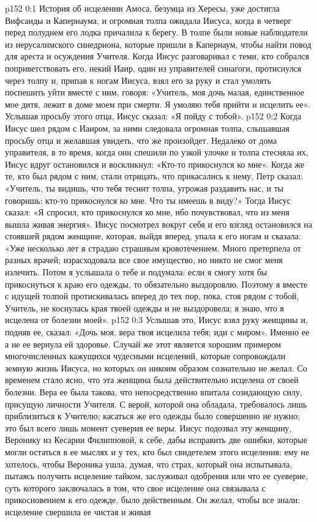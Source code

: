 \author{Комиссия срединников}
\vs p152 0:1 История об исцелении Амоса, безумца из Хересы, уже достигла Вифсаиды и Капернаума, и огромная толпа ожидала Иисуса, когда в четверг перед полуднем его лодка причалила к берегу. В толпе были новые наблюдатели из иерусалимского синедриона, которые пришли в Капернаум, чтобы найти повод для ареста и осуждения Учителя. Когда Иисус разговаривал с теми, кто собрался поприветствовать его, некий Иаир, один из управителей синагоги, протиснулся через толпу и, припав к ногам Иисуса, взял его за руку и стал умолять поспешить уйти вместе с ним, говоря: «Учитель, моя дочь малая, единственное мое дитя, лежит в доме моем при смерти. Я умоляю тебя прийти и исцелить ее». Услышав просьбу этого отца, Иисус сказал: «Я пойду с тобой».
\vs p152 0:2 Когда Иисус шел рядом с Иаиром, за ними следовала огромная толпа, слышавшая просьбу отца и желавшая увидеть, что же произойдет. Недалеко от дома управителя, в то время, когда они спешили по узкой улочке и толпа стесняла их, Иисус вдруг остановился и воскликнул: «Кто\hyp{}то прикоснулся ко мне». Когда же те, кто был рядом с ним, стали отрицать, что прикасались к нему, Петр сказал: «Учитель, ты видишь, что тебя теснит толпа, угрожая раздавить нас, и ты говоришь: кто\hyp{}то прикоснулся ко мне. Что ты имеешь в виду?» Тогда Иисус сказал: «Я спросил, кто прикоснулся ко мне, ибо почувствовал, что из меня вышла живая энергия». Иисус посмотрел вокруг себя и его взгляд остановился на стоявшей рядом женщине, которая, выйдя вперед, упала к его ногам и сказала: «Уже несколько лет я страдаю страшным кровотечением. Много претерпела от разных врачей; израсходовала все свое имущество, но никто не смог меня излечить. Потом я услышала о тебе и подумала: если я смогу хотя бы прикоснуться к краю его одежды, то обязательно выздоровлю. Поэтому я вместе с идущей толпой протискивалась вперед до тех пор, пока, стоя рядом с тобой, Учитель, не коснулась края твоей одежды и не выздоровела; я знаю, что я исцелена от болезни моей».
\vs p152 0:3 Услышав это, Иисус взял руку женщины и, подняв ее, сказал: «Дочь моя, вера твоя исцелила тебя; иди с миром». Именно ее  а не ее  вернула ей здоровье. Случай же этот является хорошим примером многочисленных кажущихся чудесными исцелений, которые сопровождали земную жизнь Иисуса, но которых он никоим образом сознательно не желал. Со временем стало ясно, что эта женщина была действительно исцелена от своей болезни. Вера ее была такова, что непосредственно впитала созидающую силу, присущую личности Учителя. С верой, которой она обладала, требовалось лишь приблизиться к Учителю; касаться же его одежды было совершенно не нужно; это был всего лишь момент суеверия ее веры. Иисус подозвал эту женщину, Веронику из Кесарии Филипповой, к себе, дабы исправить две ошибки, которые могли остаться в ее мыслях и у тех, кто был свидетелем этого исцеления: ему не хотелось, чтобы Вероника ушла, думая, что страх, который она испытывала, пытаясь получить исцеление тайком, заслуживал одобрения или что ее суеверие, суть которого заключалась в том, что свое исцеление она связывала с прикосновением к его одежде, было действенным. Он желал, чтобы все знали: исцеление свершила ее чистая и живая 
